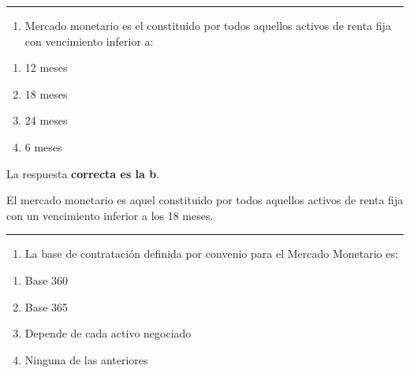 \documentclass[
  letterpaper,
  DIV=11,
  numbers=noendperiod]{scrreprt}
\providecommand{\tightlist}{%
  \setlength{\itemsep}{0pt}\setlength{\parskip}{0pt}}\usepackage{longtable,booktabs,array}
\begin{document}
\begin{center}\rule{0.5\linewidth}{0.5pt}\end{center}

\begin{enumerate}
\def\labelenumi{\arabic{enumi}.}
\setcounter{enumi}{73}
\tightlist
\item
  Mercado monetario es el constituido por todos aquellos activos de
  renta fija con vencimiento inferior a:
\end{enumerate}

\begin{enumerate}
\def\labelenumi{\alph{enumi})}
\item
  12 meses
\item
  18 meses
\item
  24 meses
\item
  6 meses
\end{enumerate}

\begin{tcolorbox}[enhanced jigsaw, left=2mm, opacityback=0, colback=white, breakable, arc=.35mm, bottomrule=.15mm, rightrule=.15mm, toprule=.15mm, leftrule=.75mm, colframe=quarto-callout-tip-color-frame]
\begin{minipage}[t]{5.5mm}
\textcolor{quarto-callout-tip-color}{\faLightbulb}
\end{minipage}%
\begin{minipage}[t]{\textwidth - 5.5mm}

La respuesta \textbf{correcta es la b}.

El mercado monetario es aquel constituido por todos aquellos activos de
renta fija con un vencimiento inferior a los 18 meses.

\end{minipage}%
\end{tcolorbox}

\begin{center}\rule{0.5\linewidth}{0.5pt}\end{center}

\begin{enumerate}
\def\labelenumi{\arabic{enumi}.}
\setcounter{enumi}{74}
\tightlist
\item
  La base de contratación definida por convenio para el Mercado
  Monetario es:
\end{enumerate}

\begin{enumerate}
\def\labelenumi{\alph{enumi})}
\item
  Base 360
\item
  Base 365
\item
  Depende de cada activo negociado
\item
  Ninguna de las anteriores
\end{enumerate}
\end{document}
